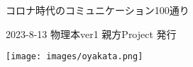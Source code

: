 \clearpage{\thispagestyle{empty}}
\begin{center}

\vspace{120pt}

\begin{sffamily}
\Large
コロナ時代のコミュニケーション100通り
\normalsize
\end{sffamily}
\vspace{320pt}

\begin{sffamily}
2023-8-13
\hspace{5pt}
物理本ver1
\hspace{5pt}
親方Project
\hspace{5pt}
発行
\vspace{10pt}
\end{sffamily}

\texttt{[image: images/oyakata.png]}

\end{center}
